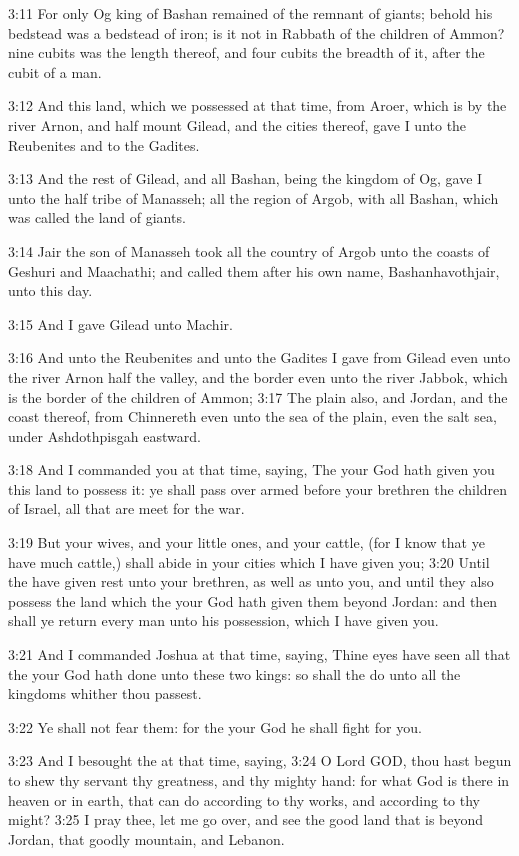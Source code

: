 3:11 For only Og king of Bashan remained of the remnant of giants;
behold his bedstead was a bedstead of iron; is it not in Rabbath of
the children of Ammon? nine cubits was the length thereof, and four
cubits the breadth of it, after the cubit of a man.

3:12 And this land, which we possessed at that time, from Aroer, which
is by the river Arnon, and half mount Gilead, and the cities thereof,
gave I unto the Reubenites and to the Gadites.

3:13 And the rest of Gilead, and all Bashan, being the kingdom of Og,
gave I unto the half tribe of Manasseh; all the region of Argob, with
all Bashan, which was called the land of giants.

3:14 Jair the son of Manasseh took all the country of Argob unto the
coasts of Geshuri and Maachathi; and called them after his own name,
Bashanhavothjair, unto this day.

3:15 And I gave Gilead unto Machir.

3:16 And unto the Reubenites and unto the Gadites I gave from Gilead
even unto the river Arnon half the valley, and the border even unto
the river Jabbok, which is the border of the children of Ammon; 3:17
The plain also, and Jordan, and the coast thereof, from Chinnereth
even unto the sea of the plain, even the salt sea, under Ashdothpisgah
eastward.

3:18 And I commanded you at that time, saying, The \LORD your God hath
given you this land to possess it: ye shall pass over armed before
your brethren the children of Israel, all that are meet for the war.

3:19 But your wives, and your little ones, and your cattle, (for I
know that ye have much cattle,) shall abide in your cities which I
have given you; 3:20 Until the \LORD have given rest unto your
brethren, as well as unto you, and until they also possess the land
which the \LORD your God hath given them beyond Jordan: and then shall
ye return every man unto his possession, which I have given you.

3:21 And I commanded Joshua at that time, saying, Thine eyes have seen
all that the \LORD your God hath done unto these two kings: so shall
the \LORD do unto all the kingdoms whither thou passest.

3:22 Ye shall not fear them: for the \LORD your God he shall fight for
you.

3:23 And I besought the \LORD at that time, saying, 3:24 O Lord GOD,
thou hast begun to shew thy servant thy greatness, and thy mighty
hand: for what God is there in heaven or in earth, that can do
according to thy works, and according to thy might?  3:25 I pray thee,
let me go over, and see the good land that is beyond Jordan, that
goodly mountain, and Lebanon.

